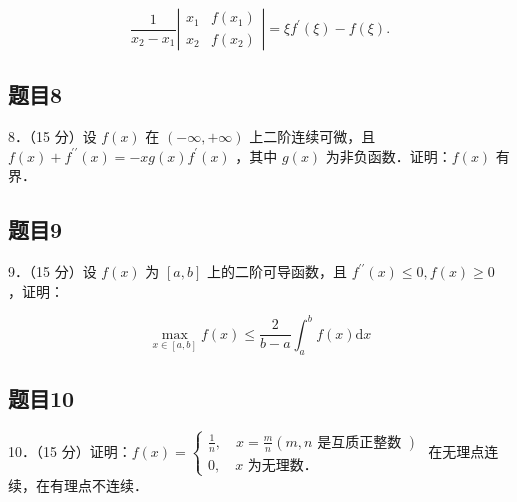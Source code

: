 \documentclass{article}
\begin{document}
\[
\frac{1}{x_{2}-x_{1}}\left|\begin{array}{ll}
x_{1} & f\left(x_{1}\right) \\
x_{2} & f\left(x_{2}\right)
\end{array}\right|=\xi f^{\prime}(\xi)-f(\xi) .
\]

\subsection{题目8}
8．（15 分）设 \(f(x)\) 在 \((-\infty,+\infty)\) 上二阶连续可微，且 \(f(x)+f^{\prime \prime}(x)=-x g(x) f^{\prime}(x)\) ，其中 \(g(x)\) 为非负函数．证明：\(f(x)\) 有界．

\subsection{题目9}
9．（15 分）设 \(f(x)\) 为 \([a, b]\) 上的二阶可导函数，且 \(f^{\prime \prime}(x) \leq 0, f(x) \geq 0\) ，证明：

\[
\max _{x \in[a, b]} f(x) \leq \frac{2}{b-a} \int_{a}^{b} f(x) \mathrm{d} x
\]

\subsection{题目10}
10．（15 分）证明：\(f(x)=\left\{\begin{array}{l}\frac{1}{n}, \quad x=\frac{m}{n}(m, n \text { 是互质正整数 }) \\ 0, \quad x \text { 为无理数．}\end{array}\right.\) 在无理点连续，在有理点不连续．
\end{document}
